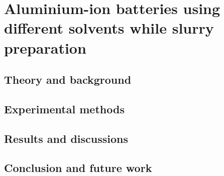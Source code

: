 
\chapter{Aluminium-ion batteries using different solvents while slurry preparation} %

\label{Chapter7} %


\newcommand{\keyword}[1]{\textbf{#1}}
\newcommand{\tabhead}[1]{\textbf{#1}}
\newcommand{\code}[1]{\texttt{#1}}
\newcommand{\file}[1]{\texttt{\bfseries#1}}
\newcommand{\option}[1]{\texttt{\itshape#1}}

\section{Theory and background}
\section{Experimental methods}
\section{Results and discussions}
\section{Conclusion and future work}